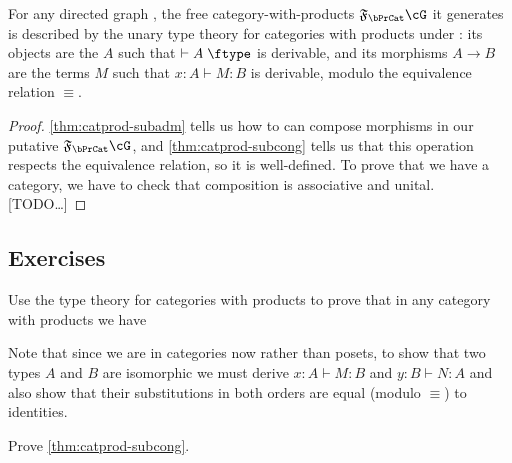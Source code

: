 \documentclass{book}
\let\types\vdash
\def\type{\;\ftype}
\newcommand{\F}[1]{\mathfrak{F}_{#1}}
\def\unit{\mathbf{1}}
\begin{document}
\begin{thm}\label{thm:catprod-initial}
  For any directed graph \cG, the free category-with-products $\F\bPrCat \cG$ it generates is described by the unary type theory for categories with products under \cG: its objects are the $A$ such that $\types A\type$ is derivable, and its morphisms $A\to B$ are the terms $M$ such that $x:A \types M:B$ is derivable, modulo the equivalence relation $\equiv$.
\end{thm}
\begin{proof}
  \cref{thm:catprod-subadm} tells us how to can compose morphisms in our putative $\F\bPrCat \cG$, and \cref{thm:catprod-subcong} tells us that this operation respects the equivalence relation, so it is well-defined.
  To prove that we have a category, we have to check that composition is associative and unital.
  [TODO\dots]
\end{proof}


\subsection*{Exercises}

\begin{ex}
  Use the type theory for categories with products to prove that in any category with products we have
  Note that since we are in categories now rather than posets, to show that two types $A$ and $B$ are isomorphic we must derive $x:A\types M:B$ and $y:B\types N:A$ and also show that their substitutions in both orders are equal (modulo $\equiv$) to identities.
\end{ex}

\begin{ex}\label{ex:catprod-subcong}
  Prove \cref{thm:catprod-subcong}.
\end{ex}
\end{document}
